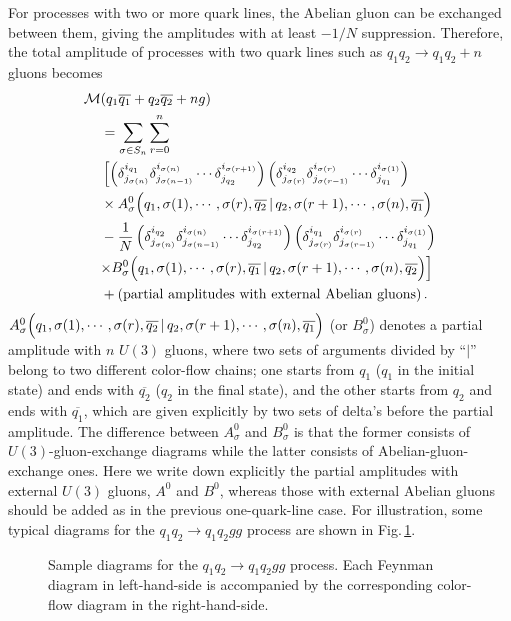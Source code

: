 For processes with two or more quark lines, the Abelian gluon can be
exchanged between them, giving the amplitudes with at
least $-1/N$
suppression.  Therefore, the total amplitude of processes with two quark lines such as  $q_1q_2\rightarrow q_1q_2+n$ gluons becomes
\begin{align}
{\cal M}&(q_1\overline{q_1}+q_2\overline{q_2}+ng)\nonumber\\
&=\sum_{\sigma\in S_n}\sum_{r=0}^n\nonumber\\
&\left[\left(\delta^{i_{q_1}}_{j_{\sigma(n)}}
\delta^{i_{\sigma(n)}}_{j_{\sigma(n-1)}}\cdots\delta^{i_{\sigma(r+1)}}_{j_{q_2}}\right)\left(\delta^{i_{q_2}}_{j_{\sigma(r)}}
\delta^{i_{\sigma(r)}}_{j_{\sigma(r-1)}}\cdots\delta^{i_{\sigma(1)}}_{j_{q_1}}\right)\right.\nonumber\\
&\times A^0_{\sigma}\Bigl(q_1,\sigma(1),\cdots,\sigma(r),\overline{q_2}\,|\,q_2,\sigma(r+1),\cdots,\sigma(n),\overline{q_1}
\Bigr)\nonumber\\
\vspace{2em}
&-\frac{1}{N}\left(\delta^{i_{q_2}}_{j_{\sigma(n)}}
\delta^{i_{\sigma(n)}}_{j_{\sigma(n-1)}}\cdots\delta^{i_{\sigma(r+1)}}_{j_{q_2}}\right)
\left(\delta^{i_{q_1}}_{j_{\sigma(r)}}
\delta^{i_{\sigma(r)}}_{j_{\sigma(r-1)}}\cdots\delta^{i_{\sigma(1)}}_{j_{q_1}}\right)
\nonumber\\
&\Bigl.\times B^0_{\sigma}\Bigl(q_1,\sigma(1),\cdots,\sigma(r),\overline{q_1}\,|\,q_2,\sigma(r+1),\cdots,\sigma(n),\overline{q_2}
\Bigr)\Bigr]\nonumber\\
&+\left({\rm partial\,\, amplitudes\,\, with \,\,external\,\,
 Abelian\,\, gluons}\right).
\label{eq:2qqng}
\end{align}
$A^0_{\sigma}\Bigl(q_1,\sigma(1),\cdots,\sigma(r),\overline{q_2}\,|\,q_2,\sigma(r+1),\cdots,\sigma(n),\overline{q_1}\Bigr)$
(or $B^0_{\sigma}$) denotes a partial
amplitude with $n$ $U(3)$ gluons, where two sets of arguments divided by ``$|$'' belong to
two different color-flow chains; one starts from $q_1$ ($q_1$ in the initial
state) and ends with $\overline{q_2}$ ($q_2$ in the final state), and the
other starts from $q_2$ and ends with $\overline{q_1}$, which are given
explicitly by two
sets of delta's before the partial amplitude. The difference between
$A^0_{\sigma}$ and $B^0_{\sigma}$ is that the former consists of $U(3)$-gluon-exchange diagrams
while the latter consists of Abelian-gluon-exchange ones.
Here we write down explicitly the partial amplitudes with external
$U(3)$ gluons,
$A^0$ and $B^0$, whereas those with external Abelian gluons should be
added as in the previous one-quark-line case. For illustration, some typical
diagrams for the $q_1q_2\rightarrow q_1q_2gg$ process
are shown in Fig.\,\ref{fig:2qqdiagrams}.
\begin{figure}
\caption{Sample diagrams for the $q_1q_2\rightarrow q_1q_2gg$ process. Each
 Feynman diagram in left-hand-side is accompanied by the corresponding
 color-flow diagram in the right-hand-side.}
\label{fig:2qqdiagrams}
\end{figure}

